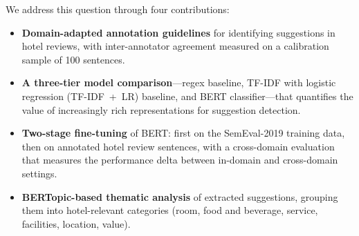 We address this question through four contributions:
\begin{itemize}
  \item \textbf{Domain-adapted annotation guidelines} for identifying
  suggestions in hotel reviews, with inter-annotator agreement measured on a
  calibration sample of 100 sentences.
  \item \textbf{A three-tier model comparison}---regex baseline, TF-IDF with
  logistic regression (TF-IDF~+~LR) baseline, and BERT classifier---that
  quantifies the value of increasingly rich representations for suggestion
  detection.
  \item \textbf{Two-stage fine-tuning} of BERT: first on the SemEval-2019
  training data, then on annotated hotel review sentences, with a cross-domain
  evaluation that measures the performance delta between in-domain and
  cross-domain settings.
  \item \textbf{BERTopic-based thematic analysis} of extracted suggestions,
  grouping them into hotel-relevant categories (room, food and beverage, service,
  facilities, location, value).
\end{itemize}
